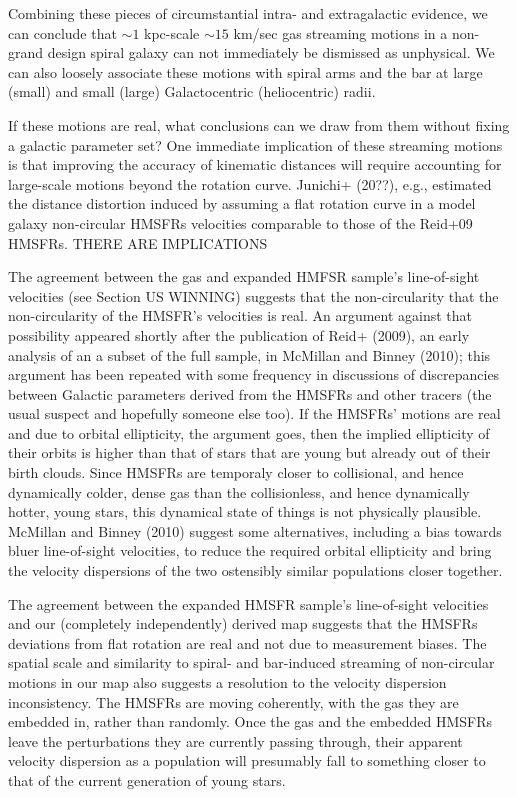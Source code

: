 Combining these pieces of circumstantial intra- and extragalactic evidence, we can conclude that $\sim 1$ kpc-scale $\sim 15$ km/sec gas streaming motions in a non-grand design spiral galaxy can not immediately be dismissed as unphysical. 
We can also loosely associate these motions with spiral arms and the bar at large (small) and small (large) Galactocentric (heliocentric) radii.

If these motions are real, what conclusions can we draw from them without fixing a galactic parameter set? One immediate implication of these streaming motions is that improving the accuracy of kinematic distances will require accounting for large-scale motions beyond the rotation curve. Junichi+ (20??), e.g., estimated the distance distortion induced by assuming a flat rotation curve in a model galaxy non-circular HMSFRs velocities comparable to those of the Reid+09 HMSFRs. 
THERE ARE IMPLICATIONS

The agreement between the gas and expanded HMFSR sample's line-of-sight velocities (see Section US WINNING) suggests that the non-circularity that the non-circularity of the HMSFR's velocities is real. 
An argument against that possibility appeared shortly after the publication of Reid+ (2009), an early analysis of an a subset of the full \Reid sample, in McMillan and Binney (2010); this argument has been repeated with some frequency in discussions of discrepancies between Galactic parameters derived from the HMSFRs and other tracers (the usual suspect and hopefully someone else too).
If the HMSFRs' motions are real and due to orbital ellipticity, the argument goes, then the implied ellipticity of their orbits is higher than that of stars that are young but already out of their birth clouds. 
Since HMSFRs are temporaly closer to collisional, and hence dynamically colder, dense gas than the collisionless, and hence dynamically hotter, young stars, this dynamical state of things is not physically plausible. 
McMillan and Binney (2010) suggest some alternatives, including a bias towards bluer line-of-sight velocities, to reduce the required orbital ellipticity and bring the velocity dispersions of the two ostensibly similar populations closer together.

The agreement between the expanded HMSFR sample's line-of-sight velocities and our (completely independently) derived map suggests that the HMSFRs deviations from flat rotation are real and not due to measurement biases.
The spatial scale and similarity to spiral- and bar-induced streaming of non-circular motions in our map also suggests a resolution to the velocity dispersion inconsistency. The HMSFRs are moving coherently, with the gas they are embedded in, rather than randomly. Once the gas and the embedded HMSFRs leave the perturbations they are currently passing through, their apparent velocity dispersion as a population will presumably fall to something closer to that of the current generation of young stars.

